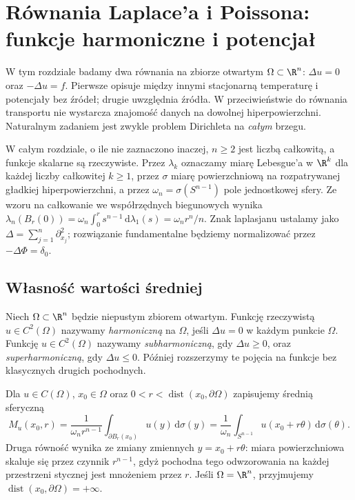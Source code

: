 \chapter[Równania Laplace'a i Poissona]{Równania Laplace'a i Poissona: funkcje harmoniczne i potencjał}
\label{chap:pde-laplace}

W tym rozdziale badamy dwa równania na zbiorze otwartym $\Omega\subset\R^n$:
$\Delta u=0$ oraz $-\Delta u=f$. Pierwsze opisuje między innymi
stacjonarną temperaturę i potencjały bez źródeł; drugie uwzględnia
źródła. W przeciwieństwie do równania transportu nie wystarcza
znajomość danych na dowolnej hiperpowierzchni. Naturalnym zadaniem
jest zwykle problem Dirichleta na \emph{całym} brzegu.

W całym rozdziale, o ile nie zaznaczono inaczej,
$n\geq2$ jest liczbą całkowitą, a funkcje skalarne są
rzeczywiste. Przez $\lambda_k$ oznaczamy miarę Lebesgue'a
w $\R^k$ dla każdej liczby całkowitej $k\geq1$, przez
$\sigma$ miarę powierzchniową na rozpatrywanej gładkiej
hiperpowierzchni, a przez $\omega_n=\sigma(S^{n-1})$
pole jednostkowej sfery. Ze wzoru na całkowanie
we współrzędnych biegunowych wynika
$\lambda_n(B_r(0))=\omega_n\int_0^r s^{n-1}\,
\mathrm d\lambda_1(s)=\omega_n r^n/n$.
Znak laplasjanu ustalamy jako $\Delta=\sum_{j=1}^n\partial_{x_j}^2$;
rozwiązanie fundamentalne będziemy normalizować przez $-\Delta\Phi=\delta_0$.

\section{Własność wartości średniej}
\label{sec:pde3-mean}

\begin{definicja}
Niech $\Omega\subset\R^n$ będzie niepustym zbiorem otwartym.
Funkcję rzeczywistą $u\in C^2(\Omega)$ nazywamy \emph{harmoniczną}
na $\Omega$, jeśli $\Delta u=0$ w każdym punkcie $\Omega$.
Funkcję $u\in C^2(\Omega)$ nazywamy \emph{subharmoniczną},
gdy $\Delta u\geq0$, oraz \emph{superharmoniczną},
gdy $\Delta u\leq0$. Później rozszerzymy te pojęcia
na funkcje bez klasycznych drugich pochodnych.
\end{definicja}

Dla $u\in C(\Omega)$, $x_0\in\Omega$ oraz
$0<r<\operatorname{dist}(x_0,\partial\Omega)$ zapisujemy
średnią sferyczną
\begin{equation}\label{eq:pde3-sphere-mean}
 M_u(x_0,r)=\frac{1}{\omega_n r^{n-1}}
 \int_{\partial B_r(x_0)}u(y)\,\mathrm d\sigma(y)
 =\frac1{\omega_n}\int_{S^{n-1}}u(x_0+r\theta)\,
 \mathrm d\sigma(\theta).
\end{equation}
Druga równość wynika ze zmiany zmiennych
$y=x_0+r\theta$: miara powierzchniowa skaluje się
przez czynnik $r^{n-1}$, gdyż pochodna tego
odwzorowania na każdej przestrzeni stycznej
jest mnożeniem przez $r$.
Jeśli $\Omega=\R^n$, przyjmujemy
$\operatorname{dist}(x_0,\partial\Omega)=+\infty$.

